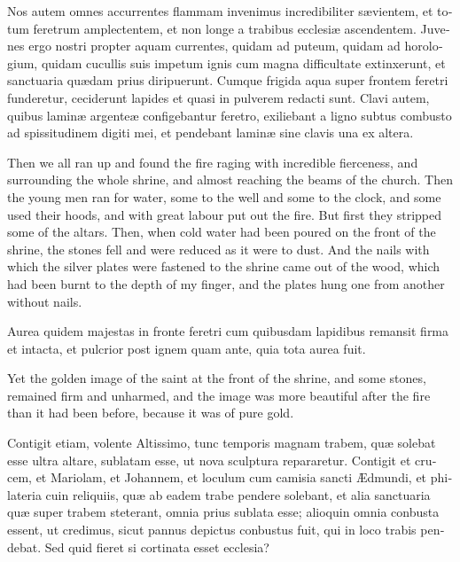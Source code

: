 \documentclass[10pt]{book}
\begin{document}
\begin{paracol}{2}
\switchcolumn*

\begin{otherlanguage}{latin}
Nos autem omnes accurrentes flammam invenimus incredibiliter s\ae{}vientem, et totum feretrum amplectentem, et non longe a trabibus ecclesi\ae{} ascendentem. Juvenes ergo nostri propter aquam currentes, quidam ad puteum, quidam ad horologium, quidam cucullis suis impetum ignis cum magna difficultate extinxerunt, et sanctuaria qu\ae{}dam prius diripuerunt. Cumque frigida aqua super frontem feretri funderetur, ceciderunt lapides et quasi in pulverem redacti sunt. Clavi autem, quibus lamin\ae{} argente\ae{} configebantur feretro, exiliebant a ligno subtus combusto ad spissitudinem digiti mei, et pendebant lamin\ae{} sine clavis una ex altera. 
\end{otherlanguage}

\switchcolumn

Then we all ran up and found the fire raging with incredible fierceness, and surrounding the whole shrine, and almost reaching the beams of the church. Then the young men ran for water, some to the well and some to the clock, and some used their hoods, and with great labour put out the fire. But first they stripped some of the altars. Then, when cold water had been poured on the front of the shrine, the stones fell and were reduced as it were to dust. And the nails with which the silver plates were fastened to the shrine came out of the wood, which had been burnt to the depth of my finger, and the plates hung one from another without nails.

\switchcolumn*

\begin{otherlanguage}{latin}
Aurea quidem majestas in fronte feretri cum quibusdam lapidibus remansit firma et intacta, et pulcrior post ignem quam ante, quia tota aurea fuit.
\end{otherlanguage}

\switchcolumn

Yet the golden image of the saint at the front of the shrine, and some stones, remained firm and unharmed, and the image was more beautiful after the fire than it had been before, because it was of pure gold.

\switchcolumn*

\begin{otherlanguage}{latin}
Contigit etiam, volente Altissimo, tunc temporis magnam trabem, qu\ae{} solebat esse ultra altare, sublatam esse, ut nova sculptura repararetur. Contigit et crucem, et Mariolam, et Johannem, et loculum cum camisia sancti \AE{}dmundi, et philateria cuin reliquiis, qu\ae{} ab eadem trabe pendere solebant, et alia sanctuaria qu\ae{} super trabem steterant, omnia prius sublata esse; alioquin omnia conbusta essent, ut credimus, sicut pannus depictus conbustus fuit, qui in loco trabis pendebat. Sed quid fieret si cortinata esset ecclesia? 
\end{otherlanguage}


\end{paracol}
\end{document}
